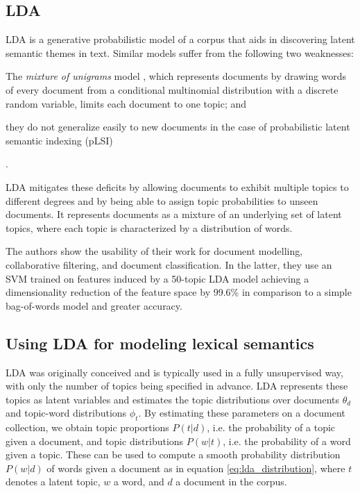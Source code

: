 \subsection{LDA}

LDA is a generative probabilistic model of a corpus that aids in discovering latent semantic themes in text. Similar models suffer from the following two weaknesses:\begin{inparaenum} \item The \textit{mixture of unigrams} model \cite{mixture_of_unigrams}, which represents documents by drawing words of every document from a conditional multinomial distribution with a discrete random variable, limits each document to one topic; and \item they do not generalize easily to new documents in the case of probabilistic latent semantic indexing (pLSI) \cite{plsi}\end{inparaenum}.

LDA mitigates these deficits by allowing documents to exhibit multiple topics to different degrees and by being able to assign topic probabilities to unseen documents. It represents documents as a mixture of an underlying set of latent topics, where each topic is characterized by a distribution of words.

The authors show the usability of their work for document modelling, collaborative filtering, and document classification. In the latter, they use an SVM trained on features induced by a 50-topic LDA model achieving a dimensionality reduction of the feature space 
by 99.6\% in comparison to a simple bag-of-words model and greater accuracy.

\subsection{Using LDA for modeling lexical semantics}

LDA was originally conceived and is typically used in a fully unsupervised way, with only the number of topics being specified in advance. LDA represents these topics as latent variables and estimates the topic distributions over documents $\theta_d$ and topic-word distributions $\phi_t$. By estimating these parameters on a document collection, we obtain topic proportions $P(t|d)$, i.e. the probability of a topic given a document, and topic distributions $P(w|t)$, i.e. the probability of a word given a topic. These can be used to compute a smooth probability distribution $P(w|d)$ of words given a document as in equation \ref{eq:lda_distribution}, where $t$ denotes a latent topic, $w$ a word, and $d$ a document in the corpus.

